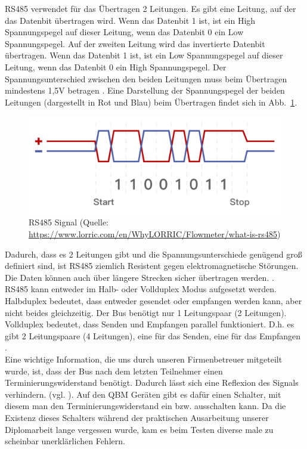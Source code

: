RS485 verwendet für das Übertragen 2 Leitungen. Es gibt eine Leitung, auf der das Datenbit übertragen wird. Wenn das Datenbit 1 ist, ist ein High Spannungspegel auf dieser Leitung, wenn das Datenbit 0 ein Low Spannungspegel. Auf der zweiten Leitung wird das invertierte Datenbit übertragen. Wenn das Datenbit 1 ist, ist ein Low Spannungspegel auf dieser Leitung, wenn das Datenbit 0 ein High Spannungspegel. Der Spannungsunterschied zwischen den beiden Leitungen muss beim Übertragen mindestens 1,5V betragen \cite{Kugelstadt:2021}. 
Eine Darstellung der Spannungspegel der beiden Leitungen (dargestellt in Rot und Blau) beim Übertragen findet sich in Abb.~\ref{fig:rs485_signal}.
\begin{figure}[H]
	\centering
	\includegraphics[width=0.5\linewidth]{Bilder/RS485_signal_illustration}
	\caption{RS485 Signal (Quelle: \url{https://www.lorric.com/en/WhyLORRIC/Flowmeter/what-is-rs485})}
	\label{fig:rs485_signal}
\end{figure}

Dadurch, dass es 2 Leitungen gibt und die Spannungsunterschiede genügend groß definiert sind, ist RS485 ziemlich Resistent gegen elektromagnetische Störungen. Die Daten können auch über längere Strecken sicher übertragen werden. \cite{Kugelstadt:2021, Heinen_Elektronik_GmbH:o.J.}. \\

RS485 kann entweder im Halb- oder Vollduplex Modus aufgesetzt werden. \newline Halbduplex bedeutet, dass entweder gesendet oder empfangen werden kann, aber nicht beides gleichzeitig. Der Bus benötigt nur 1 Leitungspaar (2 Leitungen). \newline Vollduplex bedeutet, dass Senden und Empfangen parallel funktioniert. D.h. es gibt 2 Leitungspaare (4 Leitungen), eine für das Senden, eine für das Empfangen \cite{Kugelstadt:2021}. \\

Eine wichtige Information, die uns durch unseren Firmenbetreuer mitgeteilt wurde, ist, dass der Bus nach dem letzten Teilnehmer einen Terminierungswiderstand benötigt. Dadurch lässt sich eine Reflexion des Signals verhindern. (vgl. \cite{Kugelstadt:2021}). Auf den QBM Geräten gibt es dafür einen Schalter, mit diesem man den Terminierungswiderstand ein bzw. ausschalten kann. Da die Existenz dieses Schalters während der praktischen Ausarbeitung unserer Diplomarbeit lange vergessen wurde, kam es beim Testen diverse male zu scheinbar unerklärlichen Fehlern.

